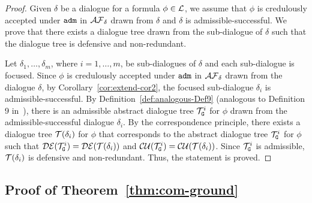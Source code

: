 \begin{proof} 
Given $\delta$ be a dialogue for a formula $\phi \in \mathcal{L}$,
we assume that $\phi$ is credulously accepted under $\texttt{\textup{adm}}$ in $\mathcal{AF}_{\delta}$ drawn from $\delta$ and $\delta$ is admissible-successful.
We prove that there exists a dialogue tree drawn from the sub-dialogue of $\delta$ such that the dialogue tree is defensive and non-redundant.




Let $\delta_1, \ldots, \delta_m$, where $i = 1, \ldots, m$, be sub-dialogues of $\delta$ and each sub-dialogue is focused.
Since $\phi$ is credulously accepted under $\texttt{\textup{adm}}$ in $\mathcal{AF}_{\delta}$ drawn from the dialogue $\delta$, by Corollary~\ref{cor:extend-cor2}, the focused sub-dialogue $\delta_{i}$ is admissible-successful.
By Definition~\ref{def:analogous-Def9} (analogous to Definition 9 in~\cite{loanho_2024}), there is an admissible abstract dialogue tree $\mathcal{T}^{i}_{\texttt{\textup{G}}}$ for $\phi$ drawn from the admissible-successful dialogue $\delta_i$.
%
By the correspondence principle, there exists a dialogue tree $\mathcal{T}(\delta_i)$ for $\phi$ that corresponds to the abstract dialogue tree $\mathcal{T}_{\texttt{\textup{G}}}^{i}$ for $\phi$ such that  $\mathcal{DE}(\mathcal{T}_{\texttt{\textup{G}}}^{i})  =  \mathcal{DE}(\mathcal{T}(\delta_i))$ and $ \mathcal{CU}(\mathcal{T}_{\texttt{\textup{G}}}^{i})  =  \mathcal{CU}(\mathcal{T}(\delta_ i))$.
Since $\mathcal{T}_{\texttt{\textup{G}}}^{i}$ is admissible, $\mathcal{T}(\delta_i)$ is defensive and non-redundant. Thus, the statement is proved.    
\end{proof}

\subsection{Proof of Theorem~\ref{thm:com-ground}}

\compground*

